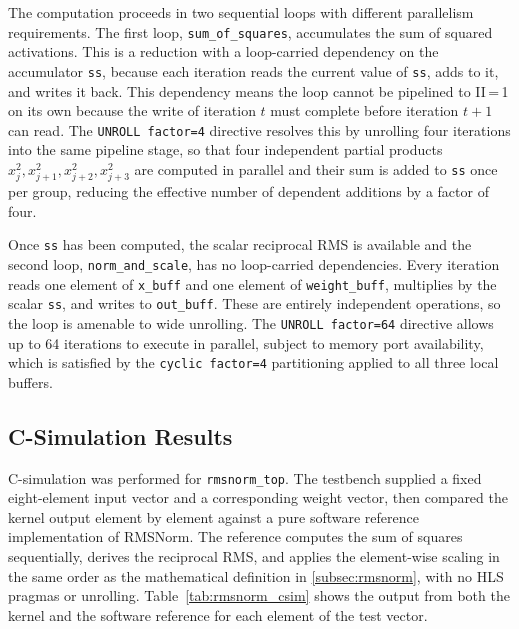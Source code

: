 The computation proceeds in two sequential loops with different parallelism
requirements. The first loop, \texttt{sum\_of\_squares}, accumulates the
sum of squared activations. This is a reduction with a loop-carried
dependency on the accumulator \texttt{ss}, because each iteration reads the
current value of \texttt{ss}, adds to it, and writes it back. This
dependency means the loop cannot be pipelined to II\,=\,1 on its own
because the write of iteration $t$ must complete before iteration $t+1$
can read. The \texttt{UNROLL factor=4} directive resolves this by
unrolling four iterations into the same pipeline stage, so that four independent
partial products $x_j^2, x_{j+1}^2, x_{j+2}^2, x_{j+3}^2$ are computed
in parallel and their sum is added to \texttt{ss} once per group, reducing
the effective number of dependent additions by a factor of four.

Once \texttt{ss} has been computed, the scalar reciprocal RMS is available
and the second loop, \texttt{norm\_and\_scale}, has no loop-carried
dependencies. Every iteration reads one element of \texttt{x\_buff} and
one element of \texttt{weight\_buff}, multiplies by the scalar \texttt{ss},
and writes to \texttt{out\_buff}. These are entirely independent operations,
so the loop is amenable to wide unrolling. The \texttt{UNROLL factor=64}
directive allows up to 64 iterations to execute in parallel, subject to
memory port availability, which is satisfied by the \texttt{cyclic
factor=4} partitioning applied to all three local buffers.

\subsection{C-Simulation Results}
\label{subsec:rmsnorm_csim}

C-simulation was performed for \texttt{rmsnorm\_top}. The testbench
supplied a fixed eight-element input vector and a corresponding weight
vector, then compared the kernel output element by element against a
pure software reference implementation of RMSNorm. The reference
computes the sum of squares sequentially, derives the reciprocal RMS,
and applies the element-wise scaling in the same order as the
mathematical definition in \cref{subsec:rmsnorm}, with no HLS pragmas
or unrolling. Table~\ref{tab:rmsnorm_csim} shows the output from both the kernel and
the software reference for each element of the test vector.

